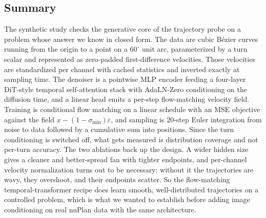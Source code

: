 \subsection{Summary}
\label{sec:syn-summary}

The synthetic study checks the generative core of the trajectory probe on a
problem whose answer we know in closed form. The data are cubic B\'ezier curves
running from the origin to a point on a $60^\circ$ unit arc, parameterized by a
turn scalar and represented as zero-padded first-difference velocities. Those
velocities are standardized per channel with cached statistics and inverted
exactly at sampling time. The denoiser is a pointwise MLP encoder feeding a
four-layer DiT-style temporal self-attention stack with AdaLN-Zero conditioning
on the diffusion time, and a linear head emits a per-step flow-matching velocity
field. Training is conditional flow matching on a linear schedule with an MSE
objective against the field $x-(1-\sigma_{\min})\varepsilon$, and sampling is
$20$-step Euler integration from noise to data followed by a cumulative sum into
positions. Since the turn conditioning is switched off, what gets measured is
distribution coverage and not per-turn accuracy. The two ablations back up the
design. A wider hidden size gives a cleaner and better-spread fan with tighter
endpoints, and per-channel velocity normalization turns out to be necessary:
without it the trajectories are wavy, they overshoot, and their endpoints
scatter. So the flow-matching temporal-transformer recipe does learn smooth,
well-distributed trajectories on a controlled problem, which is what we wanted to
establish before adding image conditioning on real nuPlan data with the same
architecture.
